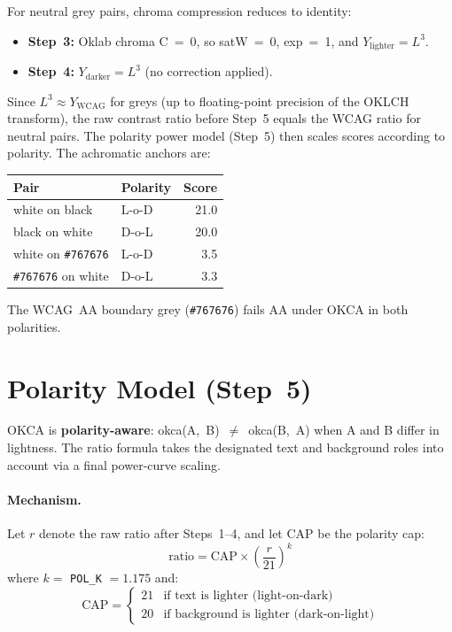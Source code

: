 \documentclass[11pt,a4paper]{article}
\begin{document}
For neutral grey pairs, chroma compression reduces to identity:

\begin{itemize}
  \item \textbf{Step~3:} Oklab chroma C~=~0, so satW~=~0, exp~=~1, and
    $Y_{\text{lighter}} = L^3$.
  \item \textbf{Step~4:} $Y_{\text{darker}} = L^3$ (no correction applied).
\end{itemize}

Since $L^3 \approx Y_{\text{WCAG}}$ for greys (up to floating-point
precision of the OKLCH transform), the raw contrast ratio before Step~5
equals the WCAG ratio for neutral pairs.  The polarity power model
(Step~5) then scales scores according to polarity.  The achromatic
anchors are:

\begin{table}[h]
\centering
\begin{tabular}{@{}llr@{}}
\toprule
\textbf{Pair} & \textbf{Polarity} & \textbf{Score} \\
\midrule
white on black              & L-o-D & 21.0 \\
black on white              & D-o-L & 20.0 \\
white on \texttt{\#767676}  & L-o-D &  3.5 \\
\texttt{\#767676} on white  & D-o-L &  3.3 \\
\bottomrule
\end{tabular}
\end{table}

The WCAG~AA boundary grey (\texttt{\#767676}) fails AA under OKCA in
both polarities.

\section{Polarity Model (Step~5)}
\label{sec:polarity}

OKCA is \textbf{polarity-aware}: okca(A,~B)~$\neq$~okca(B,~A) when A
and B differ in lightness.  The ratio formula takes the designated text
and background roles into account via a final power-curve scaling.

\paragraph{Mechanism.}
Let $r$ denote the raw ratio after Steps~1--4, and let $\text{CAP}$
be the polarity cap:
\[
  \text{ratio} = \text{CAP} \times \left(\frac{r}{21}\right)^{\!k}
\]
where $k =$ \texttt{POL\_K} $= 1.175$ and:
\[
  \text{CAP} = \begin{cases}
    21 & \text{if text is lighter (light-on-dark)} \\
    20 & \text{if background is lighter (dark-on-light)}
  \end{cases}
\]
\end{document}
